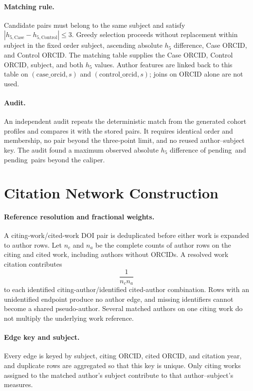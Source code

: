 \documentclass[12pt]{article}
\providecommand{\MaximumAbsoluteHFiveDifference}{pending}
\providecommand{\HFiveCaliperViolationCount}{pending}
\begin{document}
\paragraph{Matching rule.}  Candidate pairs must belong to the same subject and satisfy $|h_{5,\mathrm{Case}}-h_{5,\mathrm{Control}}|\leq3$.  Greedy selection proceeds without replacement within subject in the fixed order subject, ascending absolute $h_5$ difference, Case ORCID, and Control ORCID.  The matching table supplies the Case ORCID, Control ORCID, subject, and both $h_5$ values.  Author features are linked back to this table on $(\mathrm{case\_orcid},s)$ and $(\mathrm{control\_orcid},s)$; joins on ORCID alone are not used.

\paragraph{Audit.}  An independent audit repeats the deterministic match from the generated cohort profiles and compares it with the stored pairs.  It requires identical order and membership, no pair beyond the three-point limit, and no reused author--subject key.  The audit found a maximum observed absolute $h_5$ difference of \MaximumAbsoluteHFiveDifference\ and \HFiveCaliperViolationCount\ pairs beyond the caliper.

\section{Citation Network Construction}
\label{app:construction}

\paragraph{Reference resolution and fractional weights.}  A citing-work/cited-work DOI pair is deduplicated before either work is expanded to author rows.  Let $n_c$ and $n_a$ be the complete counts of author rows on the citing and cited work, including authors without ORCIDs.  A resolved work citation contributes
\begin{equation}
  \frac{1}{n_c n_a}
\end{equation}
to each identified citing-author/identified cited-author combination.  Rows with an unidentified endpoint produce no author edge, and missing identifiers cannot become a shared pseudo-author.  Several matched authors on one citing work do not multiply the underlying work reference.

\paragraph{Edge key and subject.}  Every edge is keyed by subject, citing ORCID, cited ORCID, and citation year, and duplicate rows are aggregated so that this key is unique.  Only citing works assigned to the matched author's subject contribute to that author--subject's measures.
\end{document}
